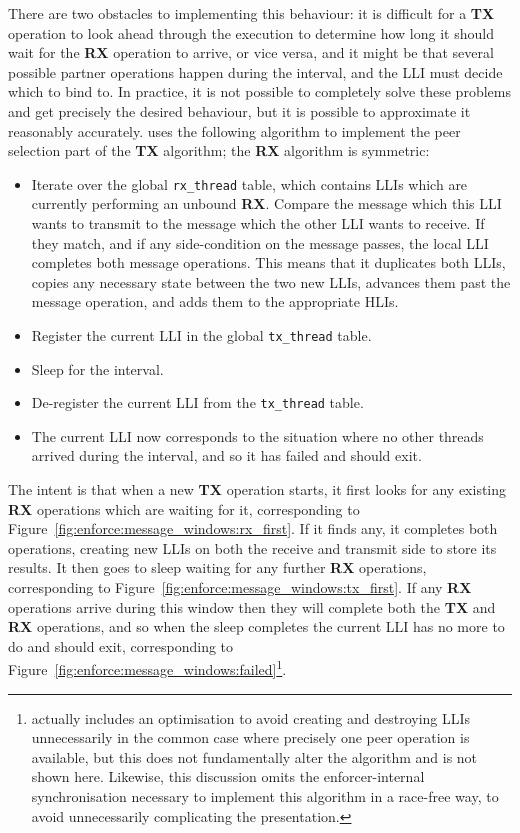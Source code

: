 There are two obstacles to implementing this behaviour: it is
difficult for a \textbf{TX} operation to look ahead through the
execution to determine how long it should wait for the \textbf{RX}
operation to arrive, or vice versa, and it might be that several
possible partner operations happen during the interval, and the LLI
must decide which to bind to.  In practice, it is not possible to
completely solve these problems and get precisely the desired
behaviour, but it is possible to approximate it reasonably accurately.
{\Implementation} uses the following algorithm to implement the peer
selection part of the \textbf{TX} algorithm; the \textbf{RX} algorithm
is symmetric:

\begin{itemize}
\item[1] Iterate over the global \texttt{rx\_thread} table, which
  contains LLIs which are currently performing an unbound \textbf{RX}.
  Compare the message which this LLI wants to transmit to the message
  which the other LLI wants to receive.  If they match, and if any
  side-condition on the message passes, the local LLI completes both
  message operations.  This means that it duplicates both LLIs, copies
  any necessary state between the two new LLIs, advances them past the
  message operation, and adds them to the appropriate HLIs.
\item[2] Register the current LLI in the global \texttt{tx\_thread}
  table.
\item[3] Sleep for the interval.
\item[4] De-register the current LLI from the \texttt{tx\_thread}
  table.
\item[5] The current LLI now corresponds to the situation where no
  other threads arrived during the interval, and so it has failed and
  should exit.
\end{itemize}

The intent is that when a new \textbf{TX} operation starts, it first
looks for any existing \textbf{RX} operations which are waiting for
it, corresponding to
Figure~\ref{fig:enforce:message_windows:rx_first}.  If it finds any,
it completes both operations, creating new LLIs on both the receive
and transmit side to store its results.  It then goes to sleep waiting
for any further \textbf{RX} operations, corresponding to
Figure~\ref{fig:enforce:message_windows:tx_first}.  If any \textbf{RX}
operations arrive during this window then they will complete both the
\textbf{TX} and \textbf{RX} operations, and so when the sleep
completes the current LLI has no more to do and should exit,
corresponding to
Figure~\ref{fig:enforce:message_windows:failed}\footnote{{\Implementation}
  actually includes an optimisation to avoid creating and destroying
  LLIs unnecessarily in the common case where precisely one peer
  operation is available, but this does not fundamentally alter the
  algorithm and is not shown here.  Likewise, this discussion omits
  the enforcer-internal synchronisation necessary to implement this
  algorithm in a race-free way, to avoid unnecessarily complicating
  the presentation.}.

